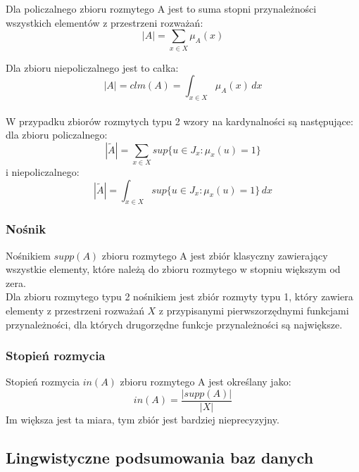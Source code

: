 \documentclass{classrep}
\begin{document}
Dla policzalnego zbioru rozmytego A jest to suma stopni przynależności wszystkich elementów z przestrzeni rozważań:
\begin{equation}
|A|=\sum_{x \in X} \mu_A(x)
\end{equation}

Dla zbioru niepoliczalnego jest to całka:
\begin{equation}
|A|=clm(A)=\int_{x \in X} \mu_A(x)\,dx
\end{equation}
\\

W przypadku zbiorów rozmytych typu 2 wzory na kardynalności są następujące:
\\
dla zbioru policzalnego:
\begin{equation}
|\tilde{A}|=\sum_{x \in X} sup\{u \in J_x:\mu_x(u)=1\}
\end{equation}
i niepoliczalnego:
\begin{equation}
|\tilde{A}|=\int_{x \in X} sup\{u \in J_x:\mu_x(u)=1\}\,dx
\end{equation}

\subsubsection{Nośnik}
Nośnikiem $supp(A)$ zbioru rozmytego A jest zbiór klasyczny zawierający wszystkie elementy, które należą do zbioru rozmytego w stopniu większym od zera.  
\\

Dla zbioru rozmytego typu 2 nośnikiem jest zbiór rozmyty typu 1, który zawiera elementy z przestrzeni rozważań $X$ z przypisanymi pierwszorzędnymi funkcjami przynależności, dla których drugorzędne funkcje przynależności są największe.

\subsubsection{Stopień rozmycia}
Stopień rozmycia $in(A)$ zbioru rozmytego A jest określany jako:
\begin{equation}
in(A)=\frac{|supp(A)|}{|X|}
\end{equation}
Im większa jest ta miara, tym zbiór jest bardziej nieprecyzyjny.

\subsection{Lingwistyczne podsumowania baz danych}
\end{document}

